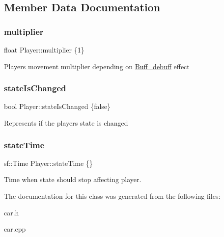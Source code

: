 \subsection{Member Data Documentation}
\mbox{\label{classPlayer_a7b4a4d41e6c36265588539e960f4804f}} 
\subsubsection{\texorpdfstring{multiplier}{multiplier}}
{\footnotesize\ttfamily float Player\+::multiplier \{1\}}

Players movement multiplier depending on \hyperlink{classBuff__debuff}{Buff\+\_\+debuff} effect \mbox{\label{classPlayer_ac074e83f791eb282589df6b9456781b7}} 
\subsubsection{\texorpdfstring{state\+Is\+Changed}{stateIsChanged}}
{\footnotesize\ttfamily bool Player\+::state\+Is\+Changed \{false\}}

Represents if the players state is changed \mbox{\label{classPlayer_a1dd84364f2b6c74be91d6d9cc2430f59}} 
\subsubsection{\texorpdfstring{state\+Time}{stateTime}}
{\footnotesize\ttfamily sf\+::\+Time Player\+::state\+Time \{\}}

Time when state should stop affecting player. 

The documentation for this class was generated from the following files\+:\begin{DoxyCompactItemize}
\item 
car.\+h\item 
car.\+cpp\end{DoxyCompactItemize}

